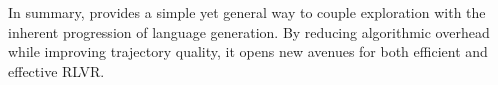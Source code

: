In summary, \alg provides a simple yet general way to couple exploration with the inherent progression of language generation. 
%
By reducing algorithmic overhead while improving trajectory quality, it opens new avenues for both efficient and effective RLVR.


%
